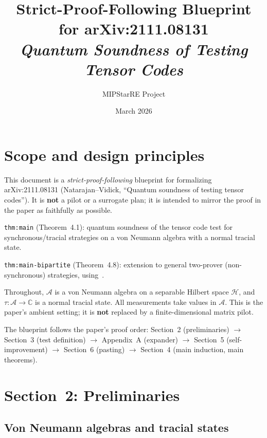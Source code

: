 \documentclass{article}
\title{Strict-Proof-Following Blueprint for arXiv:2111.08131\\
\large\textit{Quantum Soundness of Testing Tensor Codes}}
\author{MIPStarRE Project}
\date{March 2026}
\theoremstyle{remark}
\newcommand{\C}{\mathbb{C}}
\newcommand{\hilb}{\mathcal{H}}
\newcommand{\algebra}{\mathcal{A}}
\begin{document}
\maketitle
\tableofcontents

\section{Scope and design principles}
\label{sec:scope}

This document is a \emph{strict-proof-following} blueprint for formalizing
arXiv:2111.08131 (Natarajan--Vidick, ``Quantum soundness of testing tensor
codes''). It is \textbf{not} a pilot or a surrogate plan; it is intended to
mirror the proof in the paper as faithfully as possible.

\begin{description}[style=nextline,leftmargin=2.5cm]
	\item[Primary target]
	      \texttt{thm:main} (Theorem~4.1): quantum soundness of the tensor code test
	      for synchronous/tracial strategies on a von Neumann algebra with a normal
	      tracial state.
	\item[Secondary target]
	      \texttt{thm:main-bipartite} (Theorem~4.8): extension to general two-prover
	      (non-synchronous) strategies, using~\cite{vidick2021almost}.
	\item[Ambient setting]
	      Throughout, $\algebra$ is a von Neumann algebra on a separable Hilbert space
	      $\hilb$, and $\tau\colon\algebra\to\C$ is a normal tracial state.
	      All measurements take values in $\algebra$. This is the paper's ambient
	      setting; it is \textbf{not} replaced by a finite-dimensional matrix pilot.
	\item[Proof order]
	      The blueprint follows the paper's proof order:
	      Section~2 (preliminaries) $\to$ Section~3 (test definition) $\to$
	      Appendix~A (expander) $\to$ Section~5 (self-improvement) $\to$
	      Section~6 (pasting) $\to$ Section~4 (main induction, main theorems).
\end{description}

\section{Section~2: Preliminaries}
\label{sec:prelims}

\subsection{Von Neumann algebras and tracial states}
\end{document}
